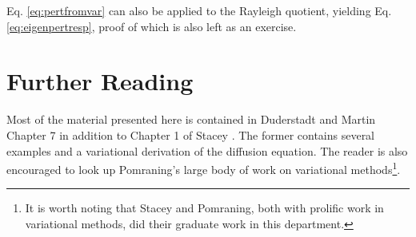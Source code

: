 Eq. \ref{eq:pertfromvar} can also be applied to the Rayleigh quotient, yielding Eq. \ref{eq:eigenpertresp}, proof of which is also left as an exercise.

\section*{Further Reading}

 Most of the material presented here is contained in Duderstadt and Martin \cite{duderstadt1976tt} Chapter 7 in addition to Chapter 1 of Stacey \cite{stacey1974vmn}.  The former contains several examples and a variational derivation of the diffusion equation.  The reader is also encouraged to look up Pomraning's large body of work on variational methods\footnote{It is worth noting that Stacey and Pomraning, both with prolific work in variational methods, did their graduate work in this department.}.

